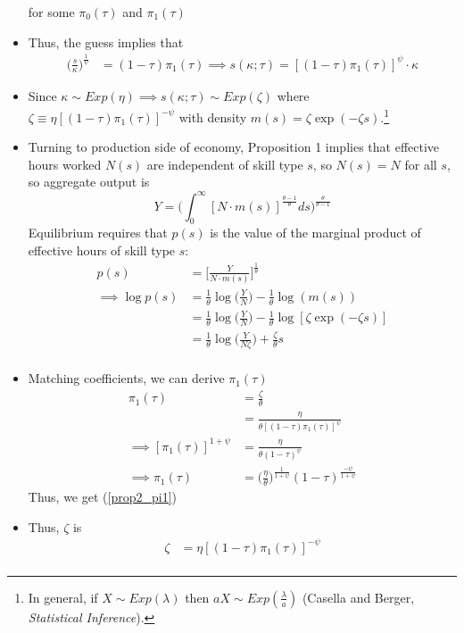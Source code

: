 \documentclass{article}
\begin{document}
\begin{itemize}
$$$$
for some $\pi_0(\tau)$ and $\pi_1(\tau)$
\item Thus, the guess implies that
\begin{align*}
\Bigg(\frac{s}{\kappa}\Bigg)^{\frac{1}{\psi}} &= (1-\tau)\pi_1(\tau) \implies s(\kappa;\tau) = [(1-\tau) \pi_1(\tau)]^{\psi} \cdot \kappa
\end{align*}
\item Since $\kappa \sim Exp(\eta) \implies s(\kappa; \tau) \sim Exp(\zeta)$ where $\zeta \equiv \eta [(1-\tau)\pi_1(\tau)]^{-\psi}$ with density $m(s) = \zeta \exp(-\zeta s)$.\footnote{In general, if $X \sim Exp(\lambda)$ then $aX \sim Exp(\frac{\lambda}{a})$ (Casella and Berger, \textit{Statistical Inference}).}
\item Turning to production side of economy, Proposition 1 implies that effective hours worked $N(s)$ are independent of skill type $s$, so $N(s) = N$ for all $s$, so aggregate output is
$$
Y = \Bigg( \int_0^\infty [N \cdot m(s)]^{\frac{\theta - 1}{\theta}} ds \Bigg)^{\frac{\theta}{\theta - 1}} 
$$
Equilibrium requires that $p(s)$ is the value of the marginal product of effective hours of skill type $s$:
\begin{align*}
p(s) 
&= \Bigg[\frac{Y}{N \cdot m(s)}\Bigg]^{\frac{1}{\theta}} \\
\implies \log p(s) 
&= \frac{1}{\theta} \log\Bigg(\frac{Y}{N}\Bigg) - \frac{1}{\theta}\log(m(s))\\
&= \frac{1}{\theta} \log\Bigg(\frac{Y}{N}\Bigg) - \frac{1}{\theta}\log[\zeta \exp(-\zeta s)]\\
&= \frac{1}{\theta} \log\Bigg(\frac{Y}{N\zeta}\Bigg) + \frac{\zeta}{\theta} s\\
\end{align*}
\item Matching coefficients, we can derive $\pi_1(\tau)$
\begin{align*}
\pi_1(\tau) 
&= \frac{\zeta}{\theta} \\
&= \frac{\eta}{\theta[(1-\tau)\pi_1(\tau)]^{\psi}} \\
\implies
[\pi_1(\tau)]^{1+\psi} 
&= \frac{\eta}{\theta(1-\tau)^{\psi}} \\
\implies
\pi_1(\tau) &= \Bigg(\frac{\eta}{\theta}\Bigg)^{\frac{1}{1+\psi}} (1-\tau)^{\frac{-\psi}{1+\psi}}
\end{align*}
Thus, we get (\ref{prop2_pi1})
\item Thus, $\zeta$ is
\begin{align*}
\zeta 
&= \eta [(1-\tau)\pi_1(\tau)]^{-\psi}\\

\end{align*}
\end{itemize}
\end{document}
